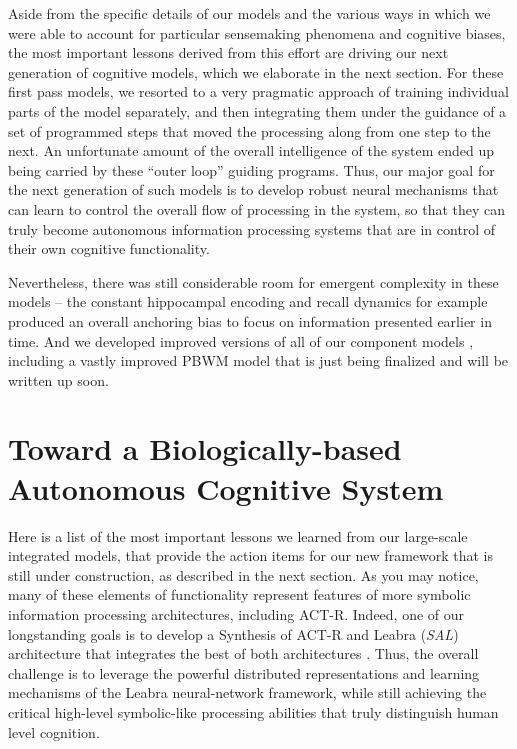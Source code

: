 \documentclass[11pt,twoside]{article}
\newif\myifpdf
\begin{document}
Aside from the specific details of our models and the various ways in which we were able to account for particular sensemaking phenomena and cognitive biases, the most important lessons derived from this effort are driving our next generation of cognitive models, which we elaborate in the next section.  For these first pass models, we resorted to a very pragmatic approach of training individual parts of the model separately, and then integrating them under the guidance of a set of programmed steps that moved the processing along from one step to the next.  An unfortunate amount of the overall intelligence of the system ended up being carried by these ``outer loop'' guiding programs.  Thus, our major goal for the next generation of such models is to develop robust neural mechanisms that can learn to control the overall flow of processing in the system, so that they can truly become autonomous information processing systems that are in control of their own cognitive functionality.

Nevertheless, there was still considerable room for emergent complexity in these models -- the constant hippocampal encoding and recall dynamics for example produced an overall anchoring bias to focus on information presented earlier in time.  And we developed improved versions of all of our component models \cite[e.g.,]{KetzMorkondaOReilly13}, including a vastly improved PBWM model that is just being finalized and will be written up soon.

\section{Toward a Biologically-based Autonomous Cognitive System}

Here is a list of the most important lessons we learned from our large-scale integrated models, that provide the action items for our new framework that is still under construction, as described in the next section.  As you may notice, many of these elements of functionality represent features of more symbolic information processing architectures, including ACT-R.  Indeed, one of our longstanding goals is to develop a Synthesis of ACT-R and Leabra ({\em SAL}) architecture that integrates the best of both architectures \cite{JilkLebiereOReillyEtAl08}.  Thus, the overall challenge is to leverage the powerful distributed representations and learning mechanisms of the Leabra neural-network framework, while still achieving the critical high-level symbolic-like processing abilities that truly distinguish human level cognition.
\end{document}
